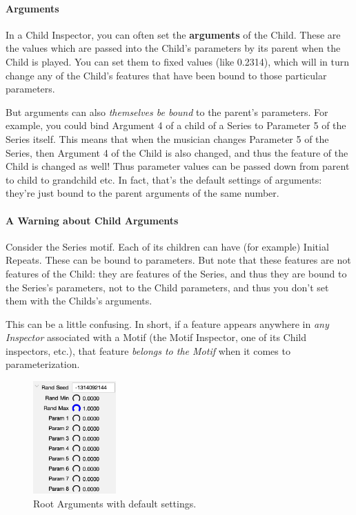 \documentclass[twoside,10pt]{article}
\begin{document}
\paragraph{Arguments}

In a Child Inspector, you can often set the {\bf arguments} of the Child.  These are the values which are passed into the Child's parameters by its parent when the Child is played.    You can set them to fixed values (like 0.2314), which will in turn change any of the Child's features that have been bound to those particular parameters.

But arguments can also {\it themselves be bound} to the parent's parameters.  For example, you could bind Argument 4 of a child of a Series to Parameter 5 of the Series itself.  This means that when the musician changes Parameter 5 of the Series, then Argument 4 of the Child is also changed, and thus the feature of the Child is changed as well!  Thus parameter values can be passed down from parent to child to grandchild etc.  In fact, that's the default settings of arguments: they're just bound to the parent arguments of the same number.

\paragraph{A Warning about Child Arguments}

Consider the Series motif. Each of its children can have (for example) Initial Repeats.  These can be bound to parameters.  But note that these features are not features of the Child: they are features of the Series, and thus they are bound to the Series's parameters, not to the Child parameters, and thus you don't set them with the Childs's arguments.

This can be a little confusing.  In short, if a feature appears anywhere in {\it any Inspector} associated with a Motif (the Motif Inspector, one of its Child inspectors, etc.), that feature {\it belongs to the Motif} when it comes to parameterization.  

\begin{figure}
\vspace{-1em}
\includegraphics[width=1.25in]{rootarguments}
\caption{Root Arguments with default settings.}
\label{rootarguments}
\end{figure}
\end{document}
